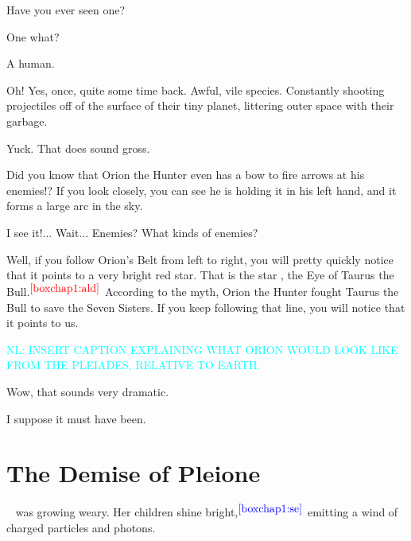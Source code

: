 \documentclass[main.tex]{subfiles}
\begin{document}
\par \Maia Have you ever seen one?

\par \Pleione One what?

\par \Maia A human.

\par \Pleione Oh!  Yes, once, quite some time back.  Awful, vile species.  Constantly shooting projectiles off of the surface of their tiny planet, littering outer space with their garbage.

\par \Maia Yuck.  That does sound gross.  

\par \Pleione Did you know that Orion the Hunter even has a bow to fire arrows at his enemies!?  If you look closely, you can see he is holding it in his left hand, and it forms a large arc in the sky.

\par \Maia I see it!... Wait... Enemies?  What kinds of enemies?

\par \Pleione Well, if you follow Orion's Belt from left to right, you will pretty quickly notice that it points to a very bright red star.  That is the star \rmaldebarran, the Eye of Taurus the Bull.$^{\textcolor{red}{\ref{boxchap1:ald}}}$  According to the myth, Orion the Hunter fought Taurus the Bull to save the Seven Sisters.  If you keep following that line, you will notice that it points to us.

\textcolor{cyan}{NL:  INSERT CAPTION EXPLAINING WHAT ORION WOULD LOOK LIKE FROM THE PLEIADES, RELATIVE TO EARTH.}

\par \Maia Wow, that sounds very dramatic.

\par \Pleione I suppose it must have been.

\section{The Demise of Pleione} \label{demise}

\par \nar \rmpleione~ was growing weary.  Her children shine bright,$^{\textcolor{blue}{\ref{boxchap1:se}}}$ emitting a wind of charged particles and photons.
\end{document}
